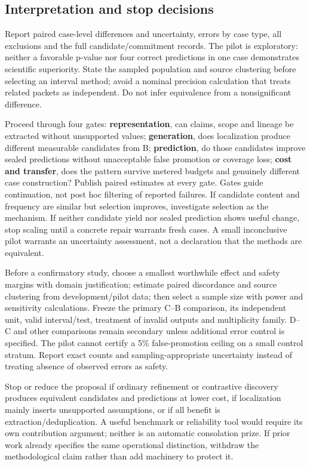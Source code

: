 \documentclass[11pt,a4paper]{article}
\begin{document}
\subsection{Interpretation and stop
decisions}\label{interpretation-and-stop-decisions}

Report paired case-level differences and uncertainty, errors by case
type, all exclusions and the full candidate/commitment records. The
pilot is exploratory: neither a favorable p-value nor four correct
predictions in one case demonstrates scientific superiority. State the
sampled population and source clustering before selecting an interval
method; avoid a nominal precision calculation that treats related
packets as independent. Do not infer equivalence from a nonsignificant
difference.

Proceed through four gates: \textbf{representation}, can claims, scope
and lineage be extracted without unsupported values;
\textbf{generation}, does localization produce different measurable
candidates from B; \textbf{prediction}, do those candidates improve
sealed predictions without unacceptable false promotion or coverage
loss; \textbf{cost and transfer}, does the pattern survive metered
budgets and genuinely different case construction? Publish paired
estimates at every gate. Gates guide continuation, not post hoc
filtering of reported failures. If candidate content and frequency are
similar but selection improves, investigate selection as the mechanism.
If neither candidate yield nor sealed prediction shows useful change,
stop scaling until a concrete repair warrants fresh cases. A small
inconclusive pilot warrants an uncertainty assessment, not a declaration
that the methods are equivalent.

Before a confirmatory study, choose a smallest worthwhile effect and
safety margins with domain justification; estimate paired discordance
and source clustering from development/pilot data; then select a sample
size with power and sensitivity calculations. Freeze the primary C--B
comparison, its independent unit, valid interval/test, treatment of
invalid outputs and multiplicity family. D--C and other comparisons
remain secondary unless additional error control is specified. The pilot
cannot certify a 5\% false-promotion ceiling on a small control stratum.
Report exact counts and sampling-appropriate uncertainty instead of
treating absence of observed errors as safety.

Stop or reduce the proposal if ordinary refinement or contrastive
discovery produces equivalent candidates and predictions at lower cost,
if localization mainly inserts unsupported assumptions, or if all
benefit is extraction/deduplication. A useful benchmark or reliability
tool would require its own contribution argument; neither is an
automatic consolation prize. If prior work already specifies the same
operational distinction, withdraw the methodological claim rather than
add machinery to protect it.
\end{document}
